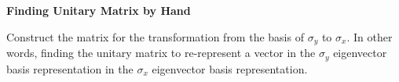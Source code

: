 \documentclass[a4paper, 10pt]{article}
\begin{document}
\subject
{}

\begin{problem}
\textbf{Finding Unitary Matrix by Hand}
\par Construct the matrix for the transformation from the basis of \( \sigma_y \) to \( \sigma_x \).
In other words, finding the unitary matrix to re-represent a vector in the \( \sigma_y \) eigenvector basis representation in the \( \sigma_x \) eigenvector basis representation.
\end{problem}
\end{document}
